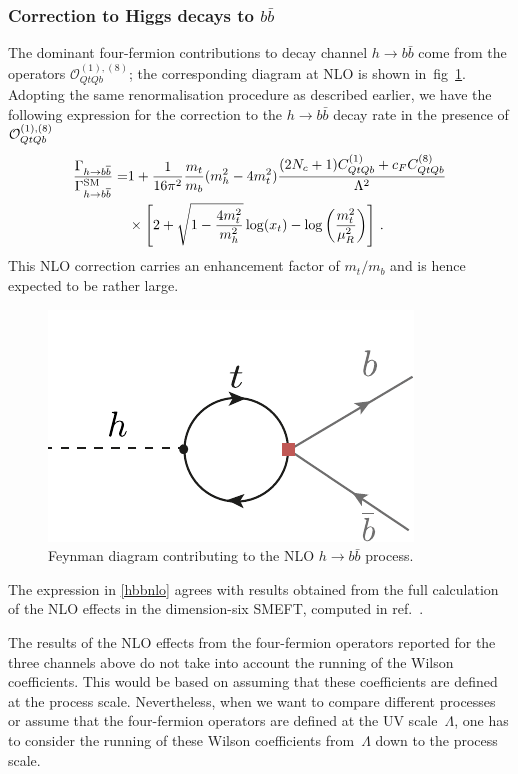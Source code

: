 		\subsubsection{Correction to Higgs decays to $b \bar{b}$ } 
	\par	The dominant four-fermion contributions to decay channel $h \to b\bar b$ come from the operators  $\mathcal{O}_{QtQb}^{(1),(8)}$; the corresponding diagram at NLO is shown in~fig~\ref{hbb}. 
		Adopting the same renormalisation procedure as described earlier, we have the following expression for the correction to 
		the $h \to b\bar b$ decay rate in the presence of ${\cal O}_{QtQb}^{(1),(8)}$
		\begin{equation}
			\begin{split}
				\frac{\Gamma_{h\to b\overline{b}}}{\Gamma_{h\to b\overline{b}}^{\mathrm{SM}}}=& 1+ \frac{1}{16\pi^2}\frac{m_t}{m_b}(m_h^2-4m_t^2)\frac{(2 N_c+1) C_{QtQb}^{(1)}+c_F C_{QtQb}^{(8)}}{\Lambda^2} \\ & \times\left[ 2+\sqrt{1-\frac{4 m_t^2}{m_h^2}}\log(x_t)-\log\left(\frac{m_t^2}{\mu_R^2}\right) \right] \,.
				\label{hbbnlo}
			\end{split}
		\end{equation}
		This NLO correction carries an enhancement factor of $m_t/m_b$ and is hence expected to be rather large.
	\begin{figure}[h!]
		\centering
		\includegraphics[scale=0.8]{./figures/Hbb}
		\caption{Feynman diagram contributing to the NLO   $h \to b \bar b$ process. }
		\label{hbb}
	\end{figure}
	The expression in \eqref{hbbnlo} agrees with results obtained from the full calculation of the NLO effects in the dimension-six SMEFT, computed in ref.~\cite{Gauld:2015lmb}. 
	\par The results of the NLO effects from the four-fermion operators reported for the three channels above do not take into account the running of the Wilson coefficients. This would be based on assuming that these coefficients are defined at the process scale. Nevertheless, when we want to compare different processes or assume that the four-fermion operators are defined at the UV scale~$\Lambda$, one has to consider the running of these Wilson coefficients from~$\Lambda$ down to the process scale.
